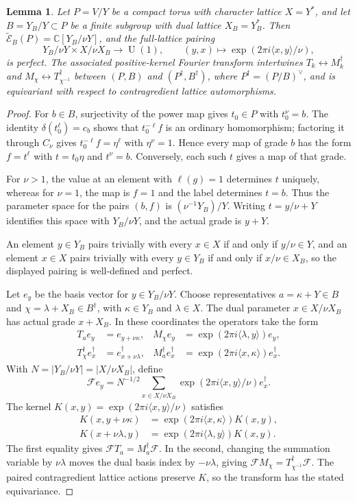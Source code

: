 \documentclass[11pt,a4paper,reqno]{amsart}
\theoremstyle{plain}
\newtheorem{lemma}[theorem]{Lemma}
\theoremstyle{definition}
\theoremstyle{remark}
\numberwithin{equation}{section}
\newcommand{\UU}{\operatorname{U}}
\newcommand{\CC}{\mathbb C}
\newcommand{\wtE}{\widetilde{\mathcal E}}
\newcommand{\pair}[2]{\langle #1,#2\rangle}
\newcommand{\eexp}[1]{\exp(2\pi i #1)}
\begin{document}
\begin{lemma}\label{lem:central-descent}
Let $P=V/Y$ be a compact torus with character lattice $X=Y^*$, and let $B=Y_B/Y\subset P$ be a finite subgroup with dual lattice $X_B=Y_B^*$. Then $\wtE_B(P)=\CC[Y_B/\nu Y]$, and the full-lattice pairing
\[
Y_B/\nu Y\times X/\nu X_B\longrightarrow\UU(1),\qquad
(y,x)\longmapsto\eexp{\pair{x}{y}/\nu},
\]
is perfect. The associated positive-kernel Fourier transform intertwines $T_k\leftrightarrow M_k^\dagger$ and $M_\chi\leftrightarrow T_{\chi^{-1}}^\dagger$ between $(P,B)$ and $(P^\dagger,B^\dagger)$, where $P^\dagger=(P/B)^\vee$, and is equivariant with respect to contragredient lattice automorphisms.
\end{lemma}
\begin{proof}
For $b\in B$, surjectivity of the power map gives $t_0\in P$ with $t_0^\nu=b$. The identity $\delta(t_0^\ell)=c_b$ shows that $t_0^{-\ell}f$ is an ordinary homomorphism; factoring it through $C_\nu$ gives $t_0^{-\ell}f=\eta^\ell$ with $\eta^\nu=1$. Hence every map of grade $b$ has the form $f=t^\ell$ with $t=t_0\eta$ and $t^\nu=b$. Conversely, each such $t$ gives a map of that grade.

For $\nu>1$, the value at an element with $\ell(g)=1$ determines $t$ uniquely, whereas for $\nu=1$, the map is $f=1$ and the label determines $t=b$. Thus the parameter space for the pairs $(b,f)$ is $(\nu^{-1}Y_B)/Y$. Writing $t=y/\nu+Y$ identifies this space with $Y_B/\nu Y$, and the actual grade is $y+Y$.

An element $y\in Y_B$ pairs trivially with every $x\in X$ if and only if $y/\nu\in Y$, and an element $x\in X$ pairs trivially with every $y\in Y_B$ if and only if $x/\nu\in X_B$, so the displayed pairing is well-defined and perfect.

Let $e_y$ be the basis vector for $y\in Y_B/\nu Y$. Choose representatives $a=\kappa+Y\in B$ and $\chi=\lambda+X_B\in B^\dagger$, with $\kappa\in Y_B$ and $\lambda\in X$. The dual parameter $x\in X/\nu X_B$ has actual grade $x+X_B$. In these coordinates the operators take the form
\[
\begin{aligned}
T_a e_y&=e_{y+\nu\kappa},
& M_\chi e_y&=\eexp{\pair{\lambda}{y}}e_y,\\
T_\chi^\dagger e_x^\dagger&=e_{x+\nu\lambda}^\dagger,
& M_a^\dagger e_x^\dagger&=\eexp{\pair{x}{\kappa}}e_x^\dagger.
\end{aligned}
\]
With $N=|Y_B/\nu Y|=|X/\nu X_B|$, define
\[
\mathcal F e_y=N^{-1/2}\sum_{x\in X/\nu X_B}\eexp{\pair{x}{y}/\nu}e_x^\dagger.
\]
The kernel $K(x,y)=\eexp{\pair{x}{y}/\nu}$ satisfies
\[
\begin{aligned}
K(x,y+\nu\kappa)&=\eexp{\pair{x}{\kappa}}K(x,y),\\
K(x+\nu\lambda,y)&=\eexp{\pair{\lambda}{y}}K(x,y).
\end{aligned}
\]
The first equality gives $\mathcal F T_a=M_a^\dagger\mathcal F$. In the second, changing the summation variable by $\nu\lambda$ moves the dual basis index by $-\nu\lambda$, giving $\mathcal F M_\chi=T_{\chi^{-1}}^\dagger\mathcal F$. The paired contragredient lattice actions preserve $K$, so the transform has the stated equivariance.
\end{proof}
\end{document}
